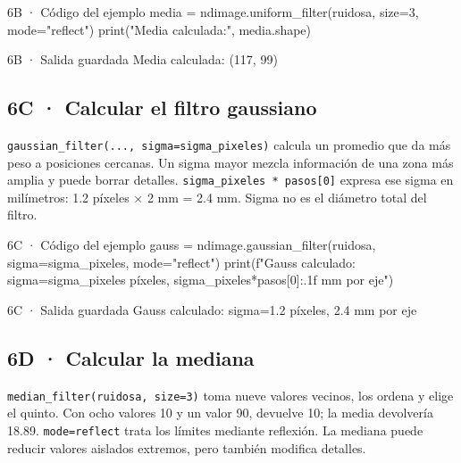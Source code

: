 \begin{CodigoVivo}{6B · Código del ejemplo}
media = ndimage.uniform_filter(ruidosa, size=3, mode="reflect")
print("Media calculada:", media.shape)
\end{CodigoVivo}


\begin{Salida}{6B · Salida guardada}
Media calculada: (117, 99)
\end{Salida}



\subsection*{6C · Calcular el filtro gaussiano}

\label{vivo:6c}

\texttt{\small gaussian\_filter(\allowbreak{}.\allowbreak{}.\allowbreak{}.\allowbreak{},\allowbreak{} sigma=sigma\_pixeles)\allowbreak{}} calcula un promedio que da más peso a posiciones cercanas. Un sigma mayor mezcla información de una zona más amplia y puede borrar detalles. \texttt{\small sigma\_pixeles * pasos[0]} expresa ese sigma en milímetros: 1.2 píxeles × 2 mm = 2.4 mm. Sigma no es el diámetro total del filtro.

\begin{CodigoVivo}{6C · Código del ejemplo}
gauss = ndimage.gaussian_filter(ruidosa, sigma=sigma_pixeles, mode="reflect")
print(f"Gauss calculado: sigma={sigma_pixeles} píxeles, {sigma_pixeles*pasos[0]:.1f} mm por eje")
\end{CodigoVivo}


\begin{Salida}{6C · Salida guardada}
Gauss calculado: sigma=1.2 píxeles, 2.4 mm por eje
\end{Salida}



\subsection*{6D · Calcular la mediana}

\label{vivo:6d}

\texttt{\small median\_filter(\allowbreak{}ruidosa,\allowbreak{} size=3)\allowbreak{}} toma nueve valores vecinos, los ordena y elige el quinto. Con ocho valores 10 y un valor 90, devuelve 10; la media devolvería 18.89. \texttt{\small mode=\textquotedbl{}reflect\textquotedbl{}} trata los límites mediante reflexión. La mediana puede reducir valores aislados extremos, pero también modifica detalles.

